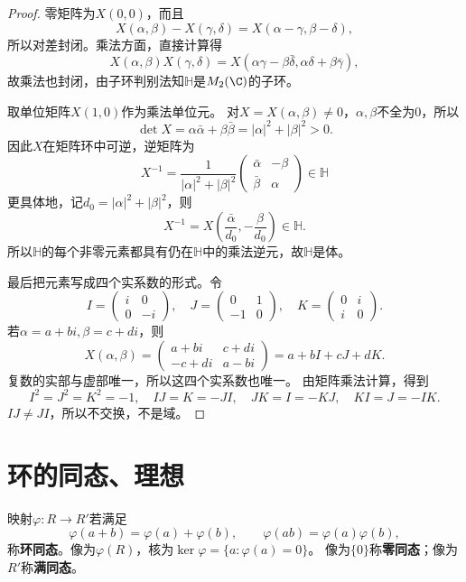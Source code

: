 \begin{proof}

零矩阵为$X(0,0)$，而且
\[
X(\alpha,\beta)-X(\gamma,\delta)
=X(\alpha-\gamma,\beta-\delta),
\]
所以对差封闭。乘法方面，直接计算得
\[
X(\alpha,\beta)X(\gamma,\delta)
=X(\alpha\gamma-\beta\bar\delta,\alpha\delta+\beta\bar\gamma),
\]
故乘法也封闭，由子环判别法知$\mathbb H$是$M_2(\C)$的子环。

取单位矩阵$X(1,0)$作为乘法单位元。
对$X=X(\alpha,\beta)\neq0$，$\alpha,\beta$不全为0，所以
\[
\det X=\alpha\bar\alpha+\beta\bar\beta=|\alpha|^2+|\beta|^2>0.
\]
因此$X$在矩阵环中可逆，逆矩阵为
\[
X^{-1}=\frac1{|\alpha|^2+|\beta|^2}
\begin{pmatrix}\bar\alpha&-\beta\\\bar\beta&\alpha\end{pmatrix}\in\mathbb H
\]
更具体地，记$d_0=|\alpha|^2+|\beta|^2$，则
\[
X^{-1}=X\left(\frac{\bar\alpha}{d_0},-\frac{\beta}{d_0}\right)\in\mathbb H.
\]
所以$\mathbb H$的每个非零元素都具有仍在$\mathbb H$中的乘法逆元，故$\mathbb H$是体。

最后把元素写成四个实系数的形式。令
\[
I=\begin{pmatrix}i&0\\0&-i\end{pmatrix},\quad
J=\begin{pmatrix}0&1\\-1&0\end{pmatrix},\quad
K=\begin{pmatrix}0&i\\i&0\end{pmatrix}.
\]
若$\alpha=a+bi,\beta=c+di$，则
\[
X(\alpha,\beta)
=\begin{pmatrix}a+bi&c+di\\-c+di&a-bi\end{pmatrix}
=a+bI+cJ+dK.
\]
复数的实部与虚部唯一，所以这四个实系数也唯一。
由矩阵乘法计算，得到
\[
I^2=J^2=K^2=-1,\quad IJ=K=-JI,\quad JK=I=-KJ,\quad KI=J=-IK.
\]
$IJ\neq JI$，所以不交换，不是域。
\end{proof}

\section{环的同态、理想}
\begin{definition}
映射$\varphi:R\to R'$若满足
\[
\varphi(a+b)=\varphi(a)+\varphi(b),\qquad\varphi(ab)=\varphi(a)\varphi(b),
\]
称\textbf{环同态}。像为$\varphi(R)$，核为$\ker\varphi=\{a:\varphi(a)=0\}$。
像为$\{0\}$称\textbf{零同态}；像为$R'$称\textbf{满同态}。
\end{definition}

